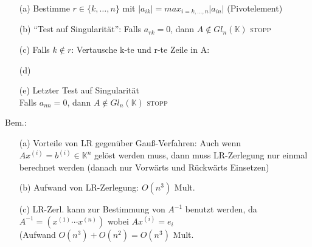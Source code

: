 \begin{enumerate}
\item[(a)] Bestimme $r \in \{k, \dots, n \} $ mit $ |a_{ik}|
= max_{i= k, \dots, n} |a_{in}|$ (Pivotelement)
\item[(b)] "`Test auf Singularität"': Falls $a_{rk}=0$, 
	dann $A \notin Gl_n(\mathbb{K})$ \textsc{stopp}
\item[(c)] 
Falls $k \notin r$: Vertausche k-te und r-te Zeile in A:


\item[(d)] 
\item[(e)]
Letzter Test auf Singularität\\
Falls $a_{nn}=0$, dann $A \notin Gl_n(\mathbb{K})$ \textsc{stopp}
\end{enumerate}
Bem.:
\begin{enumerate}
\item[(a)]
Vorteile von LR gegenüber Gauß-Verfahren: Auch wenn 
$Ax^{(i)}= b^{(i)} \in \mathbb{K}^n$ gelöst werden muss, dann muss 
LR-Zerlegung nur einmal berechnet werden (danach nur Vorwärts und 
Rückwärts Einsetzen)
\item[(b)]
Aufwand von LR-Zerlegung: $O(n^3)$ Mult.
\item[(c)]
LR-Zerl. kann zur Bestimmung von $A^{-1}$ benutzt werden, da 
$A^{-1}= (x^{(1)} \cdots x^{(n)})$ wobei $Ax^{(i)}= e_i$ \\
(Aufwand $O(n^3) + O(n^2)= O(n^3)$ Mult. 
\end{enumerate}

